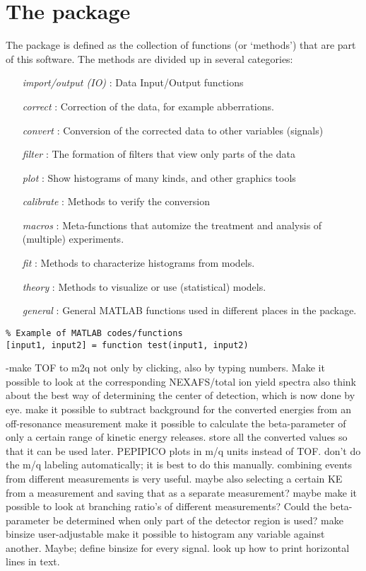 \newpage
\section{The package}
The package is defined as the collection of functions (or `methods') that are part of this software. The methods are divided up in several categories:
\begin{itemize}
\item[\emph{import/output (IO)}]: Data Input/Output functions
\item[\emph{correct}]: Correction of the data, for example abberrations.
\item[\emph{convert}]: Conversion of the corrected data to other variables (signals)
\item[\emph{filter}]: The formation of filters that view only parts of the data
\item[\emph{plot}]: Show histograms of many kinds, and other graphics tools
\item[\emph{calibrate}]: Methods to verify the conversion
\item[\emph{macros}]: Meta-functions that automize the treatment and analysis of (multiple) experiments.
\item[\emph{fit}]: Methods to characterize histograms from models.
\item[\emph{theory}]: Methods to visualize or use (statistical) models.
\item[\emph{general}]: General MATLAB functions used in different places in the package.
\end{itemize}











\lstset{language=MATLAB}
\begin{lstlisting}
% Example of MATLAB codes/functions
[input1, input2] = function test(input1, input2)
\end{lstlisting}

\if
-make TOF to m2q not only by clicking, also by typing numbers.
Make it possible to look at the corresponding NEXAFS/total ion yield spectra also
think about the best way of determining the center of detection, which is now done by eye.
make it possible to subtract background for the converted energies from an off-resonance measurement
make it possible to calculate the beta-parameter of only a certain range of kinetic energy releases.
store all the converted values so that it can be used later.
PEPIPICO plots in m/q units instead of TOF.
don't do the m/q labeling automatically; it is best to do this manually.
combining events from different measurements is very useful. maybe also selecting a certain KE from a measurement and saving that as a separate measurement?
maybe make it possible to look at branching ratio's of different measurements?
Could the beta-parameter be determined when only part of the detector region is used?
make binsize user-adjustable
make it possible to histogram any variable against another. Maybe; define binsize for every signal.
look up how to print horizontal lines in text.
\fi
